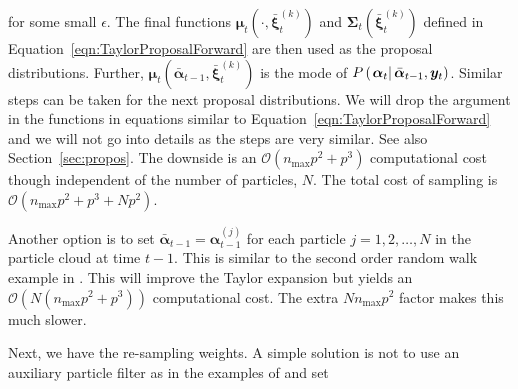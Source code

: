 \documentclass[notitlepage]{article}
\renewcommand{\vec}[1]{\bm{#1}}
\newcommand{\vecb}[1]{\bar{\vec{#1}}}
\newcommand{\mat}[1]{\mathbf{#1}}
\newcommand{\Lparen}[1]{\left( #1\right)}
\newcommand{\Cond}[2]{\left. #1 \vphantom{#2} \right\vert  #2}
\newcommand{\optor}[2]{#1\Lparen{#2}}
\newcommand{\optorC}[3]{\optor{#1}{\Cond{#2}{#3}}}
\newcommand{\partic}[3]{#1_{#2}^{\Lparen{#3}}}
\newcommand{\bigO}[1]{\mathcal{O}\Lparen{#1}}
\newcommand{\dimState}{p}
\newcommand{\nPart}{N}
\newcommand{\nMax}{n_{\text{max}}}
\begin{document}
%
for some small $\epsilon$. The final functions $\vec{\mu}_t\Lparen{\cdot, \vecb{\xi}_t^{(k)}}$ and $\mat{\Sigma}_t\Lparen{\vecb{\xi}_t^{(k)}}$ defined in Equation~\eqref{eqn:TaylorProposalForward} are then used as the proposal distributions. Further, $\vec{\mu}_t\Lparen{\vecb{\alpha}_{t - 1}, \vecb{\xi}_t^{(k)}}$ is the mode of $\optorC{P}{\vec{\alpha}_t}{\vecb{\alpha}_{t - 1}, \vec{y}_t}$. Similar steps can be taken for the next proposal distributions. We will drop the argument in the functions in equations similar to Equation~\eqref{eqn:TaylorProposalForward} and we will not go into details as the steps are very similar. See also Section~\ref{sec:propos}. The downside is an $\bigO{\nMax \dimState^2+\dimState^3}$ computational cost though independent of the number of particles, $\nPart$. The total cost of sampling is $\bigO{\nMax\dimState^2+\dimState^3 + \nPart\dimState^2}$. 

Another option is to set $\vecb{\alpha}_{t - 1} = \partic{\vec{\alpha}}{t-1}{j}$ for each particle $j = 1, 2, \dots, \nPart$ in the particle cloud at time $t - 1$. This is similar to the second order random walk example in \cite{fearnhead10}. This will improve the Taylor expansion but yields an $\bigO{\nPart\Lparen{\nMax\dimState^2+\dimState^3}}$ computational cost. The extra $\nPart\nMax p^2$ factor makes this much slower.

Next, we have the re-sampling weights. A simple solution is not to use an auxiliary particle filter as in the examples of \cite{fearnhead10} and set
\end{document}
